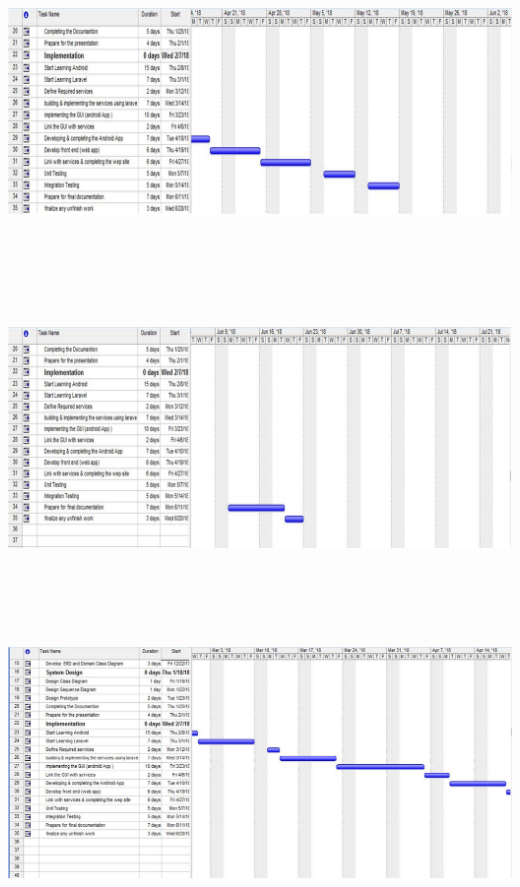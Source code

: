 \documentclass[12pt]{article}
\begin{document}
\includegraphics[width=17cm,height=8.5cm]{./assets/ganttchart/gantt-4.png}\\
\includegraphics[width=17cm,height=8.5cm]{./assets/ganttchart/gantt-5.png}\\
\includegraphics[width=17cm,height=8.5cm]{./assets/ganttchart/gantt-6.png}\\
\end{document}
